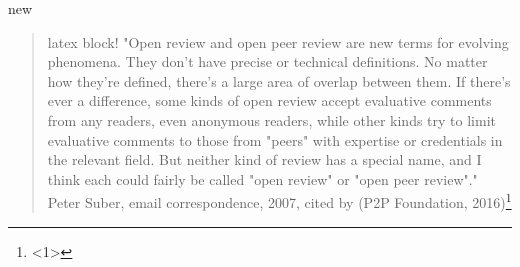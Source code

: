 new\begin{quote}

latex block! "Open review and open peer review are new terms for evolving phenomena. They don't have precise or technical definitions. No matter how they're defined, there's a large area of overlap between them. If there's ever a difference, some kinds of open review accept evaluative comments from any readers, even anonymous readers, while other kinds try to limit evaluative comments to those from "peers" with expertise or credentials in the relevant field. But neither kind of review has a special name, and I think each could fairly be called "open review" or "open peer review"." Peter Suber, email correspondence, 2007, cited by (P2P Foundation, 2016)\footnote{<1>} \end{quote} 
